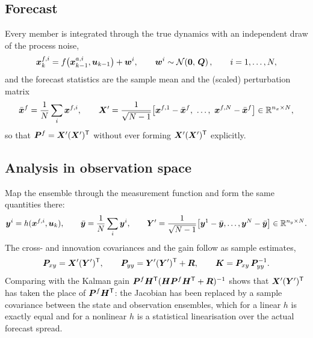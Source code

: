 \subsection{Forecast}
Every member is integrated through the true dynamics with an independent draw of the process noise,
\begin{equation}
  \bm{x}^{f,i}_k = f\big(\bm{x}^{a,i}_{k-1}, \bm{u}_{k-1}\big) + \bm{w}^i, \qquad
  \bm{w}^i \sim \mathcal{N}\!\left(\bm 0,\,\bm{Q}\right), \qquad i = 1,\dots,N,
  \label{eq:enkf-forecast}
\end{equation}
and the forecast statistics are the sample mean and the (scaled) perturbation matrix
\begin{equation}
  \bar{\vx}^f = \frac1N\sum_i \vx^{f,i}, \qquad
  \bm{X}' = \frac{1}{\sqrt{N-1}}\big[\vx^{f,1}-\bar{\vx}^f,\ \dots,\ \vx^{f,N}-\bar{\vx}^f\big] \in \real^{n_x\times N},
  \label{eq:enkf-Xp}
\end{equation}
so that $\bm{P}^f = \bm{X}'(\bm{X}')^{\mathsf{T}}$ without ever forming $\bm{X}'(\bm{X}')^{\mathsf{T}}$ explicitly.

\subsection{Analysis in observation space}
Map the ensemble through the measurement function and form the same quantities there:
\begin{equation}
  \bm{y}^i = h(\bm{x}^{f,i},\bm{u}_k), \qquad \bar{\bm{y}} = \frac1N\sum_i \bm{y}^i, \qquad
  \bm{Y}' = \frac{1}{\sqrt{N-1}}\big[\bm{y}^1-\bar{\bm{y}},\dots,\bm{y}^N-\bar{\bm{y}}\big] \in \mathbb{R}^{n_y\times N}.
  \label{eq:enkf-Yp}
\end{equation}
The cross- and innovation covariances and the gain follow as sample estimates,
\begin{equation}
  \bm{P}_{xy} = \bm{X}'(\bm{Y}')^{\mathsf{T}}, \qquad
  \bm{P}_{yy} = \bm{Y}'(\bm{Y}')^{\mathsf{T}} + \bm{R}, \qquad
  \bm{K} = \bm{P}_{xy}\,\bm{P}_{yy}^{-1} .
  \label{eq:enkf-K}
\end{equation}
Comparing with the Kalman gain $\bm{P}^f\bm{H}^{\mathsf{T}}(\bm{H}\bm{P}^f\bm{H}^{\mathsf{T}}+\bm{R})^{-1}$ shows that $\bm{X}'(\bm{Y}')^{\mathsf{T}}$ has
taken the place of $\bm{P}^f\bm{H}^{\mathsf{T}}$: the Jacobian has been replaced by a sample covariance between the
state and observation ensembles, which for a linear $h$ is exactly equal and for a nonlinear $h$ is
a statistical linearisation over the actual forecast spread.

